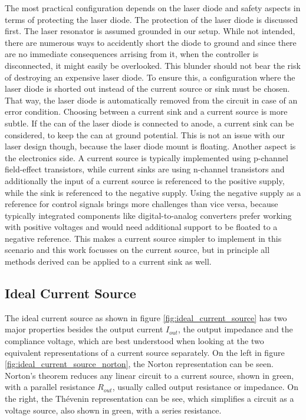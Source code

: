 The most practical configuration depends on the laser diode and safety aspects in terms of protecting the laser diode. The protection of the laser diode is discussed first. The laser resonator is assumed grounded in our setup. While not intended, there are numerous ways to accidently short the diode to ground and since there are no immediate consequences arrising from it, when the controller is disconnected, it might easily be overlooked. This blunder should not bear the risk of destroying an expensive laser diode. To ensure this, a configuration where the laser diode is shorted out instead of the current source or sink must be chosen. That way, the laser diode is automatically removed from the circuit in case of an error condition.
Choosing between a current sink and a current source is more subtle. If the can of the laser diode is connected to anode, a current sink can be considered, to keep the can at ground potential. This is not an issue with our laser design though, because the laser diode mount is floating. Another aspect is the electronics side. A current source is typically implemented using p-channel field-effect transistors, while current sinks are using n-channel transistors and additionally the input of a current source is referenced to the positive supply, while the sink is referenced to the negative supply. Using the negative supply as a reference for control signals brings more challenges than vice versa, because typically integrated components like digital-to-analog converters prefer working with positive voltages and would need additional support to be floated to a negative reference. This makes a current source simpler to implement in this scenario and this work focusses on the current source, but in principle all methods derived can be applied to a current sink as well.

\subsection{Ideal Current Source}
The ideal current source as shown in figure \ref{fig:ideal_current_source} has two major properties besides the output current $I_{out}$, the output impedance and the compliance voltage, which are best understood when looking at the two equivalent representations of a current source separately. On the left in figure \ref{fig:ideal_current_source_norton}, the Norton representation can be seen. Norton's theorem reduces any linear circuit to a current source, shown in green, with a parallel resistance $R_{out}$, usually called output resistance or impedance. On the right, the Thévenin representation can be see, which simplifies a circuit as a voltage source, also shown in green, with a series resistance.

